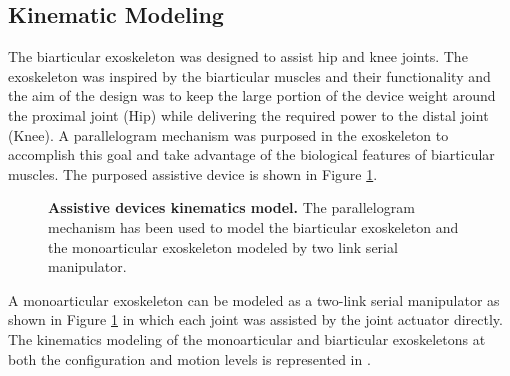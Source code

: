 \documentclass[10pt,letterpaper]{article}
\begin{document}
\subsection*{Kinematic Modeling}
The biarticular exoskeleton was designed to assist hip and knee joints. The exoskeleton was inspired by the biarticular muscles and their functionality and the aim of the design was to keep the large portion of the device weight around the proximal joint (Hip) while delivering the required power to the distal joint (Knee). A parallelogram mechanism was purposed in the exoskeleton to accomplish this goal and take advantage of the biological features of biarticular muscles. The purposed assistive device is shown in Figure \ref{Fig_Exos_Kinematics_Model}.\\
\begin{figure}[h!]
	\centering
	\hfil
	\vspace{1mm}
	\caption{\small{\textbf{Assistive devices kinematics model.} The parallelogram mechanism has been used to model the biarticular exoskeleton and the monoarticular exoskeleton modeled by two link serial manipulator.}}
	\label{Fig_Exos_Kinematics_Model}
\end{figure}
A monoarticular exoskeleton can be modeled as a two-link serial manipulator as shown in Figure \ref{Fig_Exos_Kinematics_Model} in which each joint was assisted by the joint actuator directly. The kinematics modeling of the monoarticular and biarticular exoskeletons at both the configuration and motion levels is represented in .\\
\end{document}
